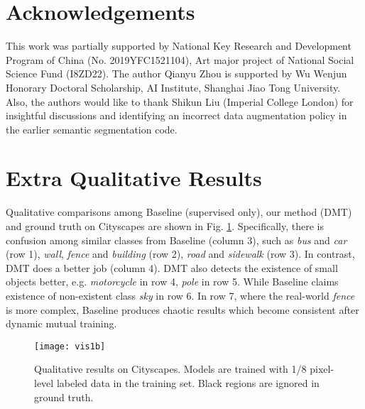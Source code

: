 \documentclass[preprint,review,10pt]{elsarticle}
\begin{document}
\section{Acknowledgements}

This work was partially supported by National Key Research and Development Program of China (No. 2019YFC1521104), Art major project of National Social Science Fund (I8ZD22). The author Qianyu Zhou is supported by Wu Wenjun Honorary Doctoral Scholarship, AI Institute, Shanghai Jiao Tong University. Also, the authors would like to thank Shikun Liu (Imperial College London) for insightful discussions and identifying an incorrect data augmentation policy in the earlier semantic segmentation code.




























\appendix

\section{Extra Qualitative Results}
\label{sec:a1}

Qualitative comparisons among Baseline (supervised only), our method (DMT) and ground truth on Cityscapes are shown in Fig. \ref{fig11}. Specifically, there is confusion among similar classes from Baseline (column 3), such as \textit{bus} and \textit{car} (row 1), \textit{wall}, \textit{fence} and \textit{building} (row 2), \textit{road} and \textit{sidewalk} (row 3). In contrast, DMT does a better job (column 4). DMT also detects the existence of small objects better, e.g. \textit{motorcycle} in row 4, \textit{pole} in row 5. While Baseline claims existence of non-existent class \textit{sky} in row 6. In row 7, where the real-world \textit{fence} is more complex, Baseline produces chaotic results which become consistent after dynamic mutual training.

\begin{figure}[t]
\centering
\texttt{[image: vis1b]}
\caption{Qualitative results on Cityscapes. Models are trained with 1/8 pixel-level labeled data in the training set. Black regions are ignored in ground truth. }
\label{fig11}
\end{figure}
\end{document}
